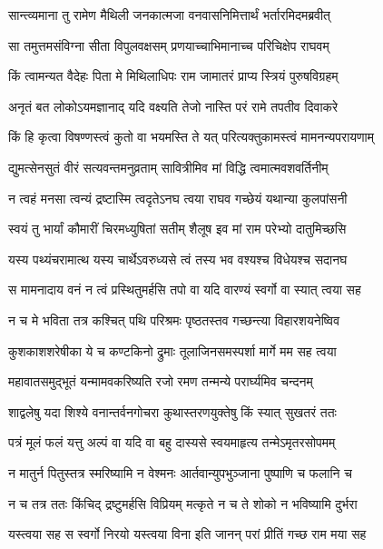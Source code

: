 
\twolineshloka
{सान्त्व्यमाना तु रामेण मैथिली जनकात्मजा}
{वनवासनिमित्तार्थं भर्तारमिदमब्रवीत्} %

\twolineshloka
{सा तमुत्तमसंविग्ना सीता विपुलवक्षसम्}
{प्रणयाच्चाभिमानाच्च परिचिक्षेप राघवम्} %

\twolineshloka
{किं त्वामन्यत वैदेहः पिता मे मिथिलाधिपः}
{राम जामातरं प्राप्य स्त्रियं पुरुषविग्रहम्} %

\twolineshloka
{अनृतं बत लोकोऽयमज्ञानाद् यदि वक्ष्यति}
{तेजो नास्ति परं रामे तपतीव दिवाकरे} %

\twolineshloka
{किं हि कृत्वा विषण्णस्त्वं कुतो वा भयमस्ति ते}
{यत् परित्यक्तुकामस्त्वं मामनन्यपरायणाम्} %

\twolineshloka
{द्युमत्सेनसुतं वीरं सत्यवन्तमनुव्रताम्}
{सावित्रीमिव मां विद्धि त्वमात्मवशवर्तिनीम्} %

\twolineshloka
{न त्वहं मनसा त्वन्यं द्रष्टास्मि त्वदृतेऽनघ}
{त्वया राघव गच्छेयं यथान्या कुलपांसनी} %

\twolineshloka
{स्वयं तु भार्यां कौमारीं चिरमध्युषितां सतीम्}
{शैलूष इव मां राम परेभ्यो दातुमिच्छसि} %

\twolineshloka
{यस्य पथ्यंचरामात्थ यस्य चार्थेऽवरुध्यसे}
{त्वं तस्य भव वश्यश्च विधेयश्च सदानघ} %

\twolineshloka
{स मामनादाय वनं न त्वं प्रस्थितुमर्हसि}
{तपो वा यदि वारण्यं स्वर्गो वा स्यात् त्वया सह} %

\twolineshloka
{न च मे भविता तत्र कश्चित् पथि परिश्रमः}
{पृष्ठतस्तव गच्छन्त्या विहारशयनेष्विव} %

\twolineshloka
{कुशकाशशरेषीका ये च कण्टकिनो द्रुमाः}
{तूलाजिनसमस्पर्शा मार्गे मम सह त्वया} %

\twolineshloka
{महावातसमुद्भूतं यन्मामवकरिष्यति}
{रजो रमण तन्मन्ये परार्घ्यमिव चन्दनम्} %

\twolineshloka
{शाद्वलेषु यदा शिश्ये वनान्तर्वनगोचरा}
{कुथास्तरणयुक्तेषु किं स्यात् सुखतरं ततः} %

\twolineshloka
{पत्रं मूलं फलं यत्तु अल्पं वा यदि वा बहु}
{दास्यसे स्वयमाहृत्य तन्मेऽमृतरसोपमम्} %

\twolineshloka
{न मातुर्न पितुस्तत्र स्मरिष्यामि न वेश्मनः}
{आर्तवान्युपभुञ्जाना पुष्पाणि च फलानि च} %

\twolineshloka
{न च तत्र ततः किंचिद् द्रष्टुमर्हसि विप्रियम्}
{मत्कृते न च ते शोको न भविष्यामि दुर्भरा} %

\twolineshloka
{यस्त्वया सह स स्वर्गो निरयो यस्त्वया विना}
{इति जानन् परां प्रीतिं गच्छ राम मया सह} %

